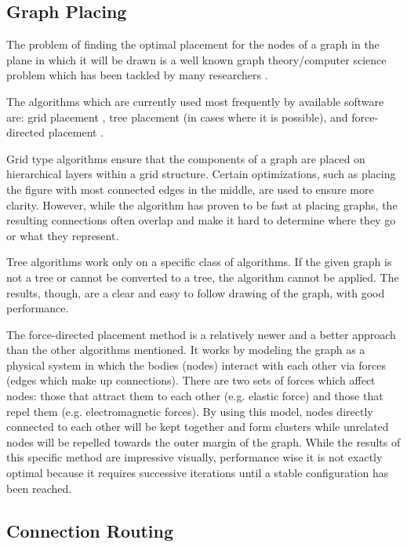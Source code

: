\subsection{Graph Placing}

The problem of finding the optimal placement for the nodes of a graph in the plane
in which it will be drawn is a well known graph theory/computer science problem
which has been tackled by many researchers \cite{battista1994algorithms}.

The algorithms which are currently used most frequently by available software are:
grid placement \cite{tamassia1987embedding}, tree placement (in cases where it is possible), and force-directed placement \cite{fruchterman1991graph}.

Grid type algorithms ensure that the components of a graph are placed on hierarchical layers within a
grid structure. Certain optimizations, such as placing the figure with most connected edges in the middle,
are used to ensure more clarity. However, while the algorithm has proven to be fast at placing graphs,
the resulting connections often overlap and make it hard to determine where they go or what they represent.

Tree algorithms work only on a specific class of algorithms. If the given graph is not a tree or cannot be
converted to a tree, the algorithm cannot be applied. The results, though, are a clear and easy to follow
drawing of the graph, with good performance.

The force-directed placement method is a relatively newer and a better approach than the other algorithms mentioned.
It works by modeling the graph as a physical system in which the bodies (nodes) interact with each other via
forces (edges which make up connections). There are two sets of forces which affect nodes: those that attract
them to each other (e.g. elastic force) and those that repel them (e.g. electromagnetic forces). By using
this model, nodes directly connected to each other will be kept together and form clusters while unrelated
nodes will be repelled towards the outer margin of the graph. While the results of this specific method are
impressive visually, performance wise it is not exactly optimal because it requires successive iterations
until a stable configuration has been reached.

\subsection{Connection Routing}

